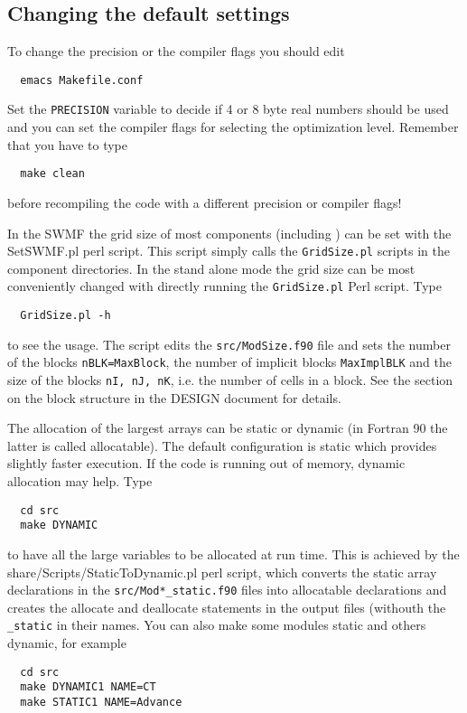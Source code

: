 \subsection{Changing the default settings}

To change the precision or the compiler flags you should edit 
\begin{verbatim}
  emacs Makefile.conf
\end{verbatim}
Set the {\tt PRECISION} variable to decide
if 4 or 8 byte real numbers should be used and you can set the compiler flags
for selecting the optimization level. Remember that you have to type
\begin{verbatim}
  make clean
\end{verbatim}
before recompiling the code with a different precision or compiler flags!

In the SWMF the grid size of most components (including \BATSRUS) can
be set with the SetSWMF.pl perl script. This script simply calls
the {\tt GridSize.pl} scripts in the component directories.
In the stand alone mode the grid size can be most conveniently 
changed with directly running the {\tt GridSize.pl} Perl script. Type
\begin{verbatim}
  GridSize.pl -h
\end{verbatim}
to see the usage. The script edits the {\tt src/ModSize.f90} file
and sets the number of the blocks {\tt nBLK=MaxBlock},
the number of implicit blocks {\tt MaxImplBLK}             %
and the size of the blocks {\tt nI, nJ, nK}, i.e. the number of cells
in a block.
See the section on the block structure in the DESIGN document for details.

The allocation of the largest arrays can be static or dynamic
(in Fortran 90 the latter is called allocatable). The default
configuration is static which provides slightly faster execution.
If the code is running out of memory, dynamic allocation may help.
Type
\begin{verbatim}
  cd src
  make DYNAMIC
\end{verbatim}
to have all the large variables to be allocated at run time.
This is achieved by the share/Scripts/StaticToDynamic.pl perl
script, which converts the static array declarations in the
{\tt src/Mod*\_static.f90} files into
allocatable declarations and creates the allocate and deallocate
statements in the output files (withouth the {\tt \_static} in their
names. You can also make some modules static and others dynamic, for example
\begin{verbatim}
  cd src
  make DYNAMIC1 NAME=CT
  make STATIC1 NAME=Advance
\end{verbatim}

